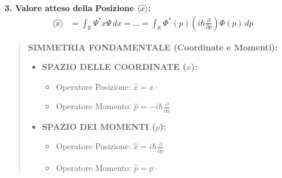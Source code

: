 \documentclass[11pt, a4paper]{article}
\begin{document}
\noindent
\textbf{3. Valore atteso della Posizione $\langle \hat{x} \rangle$:} %
\begin{align*}
    \langle \hat{x} \rangle &= \int_{\mathbb{R}} \Psi^* x \Psi \, dx = \dots = \int_{\mathbb{R}} \Phi^*(p) \left( i\hbar \frac{\partial}{\partial p} \right) \Phi(p) \, dp %
\end{align*}

\begin{quote}
    \textbf{SIMMETRIA FONDAMENTALE (Coordinate e Momenti):} %
    \begin{itemize}
        \item \textbf{SPAZIO DELLE COORDINATE ($x$):} %
        \begin{itemize}
            \item Operatore Posizione: $\hat{x} = x \cdot$ %
            \item Operatore Momento: $\hat{p} = -i\hbar \frac{\partial}{\partial x}$ %
        \end{itemize}
        \item \textbf{SPAZIO DEI MOMENTI ($p$):} %
        \begin{itemize}
            \item Operatore Posizione: $\hat{x} = i\hbar \frac{\partial}{\partial p}$ %
            \item Operatore Momento: $\hat{p} = p \cdot$ %
        \end{itemize}
    \end{itemize}
\end{quote}
\end{document}
